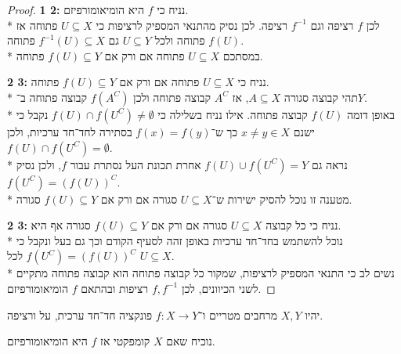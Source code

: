 \begin{proof}
	\textbf{1 \leftarrow{} 2:}
	נניח כי $f$ היא הומיאומורפיזם. \\*
	לכן $f$ רציפה וגם $f^{-1}$ רציפה. לכן נסיק מהתנאי המספיק לרציפות כי $U \subseteq X$ פתוחה אז $f(U)$ פתוחה ולכל $U \subseteq Y$ גם $f^{-1}(U) \subseteq X$ פתוחה. \\*
	במסתכם $U \subseteq X$ פתוחה אם ורק אם $f(U) \subseteq Y$ פתוחה.

	\textbf{2 \leftarrow{} 3:}
	נניח כי $U \subseteq X$ פתוחה אם ורק אם $f(U) \subseteq Y$ פתוחה. \\*
	תהי קבוצה סגורה $A \subseteq X$, אז $A^C$ קבוצה פתוחה ולכן $f(A^C)$ קבוצה פתוחה ב־$Y$. \\*
	באופן דומה $f(U)$ קבוצה פתוחה. אילו נניח בשלילה כי $f(U) \cap f(U^C) \ne \emptyset$ נקבל כי ישנם $x \ne y \in X$ כך ש־$f(x) = f(y)$ בסתירה לחד־חד ערכיות, ולכן $f(U) \cap f(U^C) = \emptyset$. \\*
	נראה גם $f(U) \cup f(U^C) = Y$ אחרת תכונת העל נסתרת עבור $f$, ולכן נסיק $f(U^C) = {(f(U))}^C$. \\*
	מטענה זו נוכל להסיק ישירות ש־$U \subseteq X$ סגורה אם ורק אם $f(U) \subseteq Y$ סגורה.

	\textbf{2 \leftarrow{} 3:}
	נניח כי כל קבוצה $U \subseteq X$ סגורה אם ורק אם $f(U) \subseteq Y$ סגורה אף היא. \\*
	נוכל להשתמש בחד־חד ערכיות באופן זהה לסעיף הקודם וכך גם בעל ונקבל כי $f(U^C) = {(f(U))}^C$ לכל $U \subseteq X$. \\*
	נשים לב כי התנאי המספיק לרציפות, שמקור כל קבוצה פתוחה הוא קבוצה פתוחה מתקיים לשני הכיוונים, לכן $f, f^{-1}$ רציפות ובהתאם $f$ הומיאומורפיזם.
\end{proof}

\Question{}
יהיו $X, Y$ מרחבים מטריים ו־$f : X \to Y$ פונקציה חד־חד ערכית, על ורציפה.

\Subquestion{}
נוכיח שאם $X$ קומפקטי אז $f$ היא הומיאומורפיזם.


